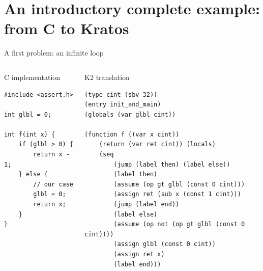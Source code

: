 \documentclass[aspectratio=1610,10.5pt]{beamer} %
\begin{document}
\section{An introductory complete example: from C to Kratos}
\begin{frame}[fragile]{A first problem: an infinite loop}
    \begin{columns}
        \begin{column}{0.3\textwidth}
            \begin{block}{C implementation}
                    \begin{verbatim}
#include <assert.h>

int glbl = 0;

int f(int x) {
    if (glbl > 0) {
        return x - 1;
    } else {
        // our case
        glbl = 0;
        return x;
    }
}
                    \end{verbatim}
            \end{block}
        \end{column}
        \begin{column}{0.65\textwidth}
            \begin{block}{K2 translation}
                    \begin{verbatim}
(type cint (sbv 32))
(entry init_and_main)
(globals (var glbl cint))

(function f ((var x cint))
    (return (var ret cint)) (locals)
    (seq
        (jump (label then) (label else))
        (label then)
        (assume (op gt glbl (const 0 cint)))
        (assign ret (sub x (const 1 cint)))
        (jump (label end))
        (label else)
        (assume (op not (op gt glbl (const 0 cint))))
        (assign glbl (const 0 cint))
        (assign ret x)
        (label end)))
                    \end{verbatim}
            \end{block}
        \end{column}
    \end{columns}
\end{frame}
\end{document}
